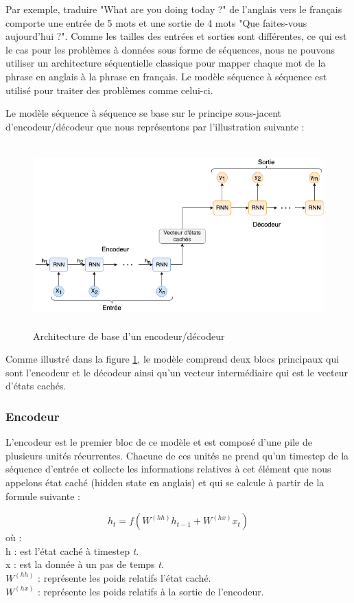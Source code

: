 Par exemple, traduire "What are you doing today ?" de l'anglais vers le français comporte une entrée de 5 mots et une sortie de 4 mots "Que faites-vous aujourd'hui ?". Comme les tailles des entrées et sorties sont différentes, ce qui est le cas pour les problèmes à données sous forme de séquences, nous ne pouvons utiliser un architecture séquentielle classique pour mapper chaque mot de la phrase en anglais à la phrase en français. Le modèle séquence à séquence est utilisé pour traiter des problèmes comme celui-ci.

Le modèle séquence à séquence se base sur le principe sous-jacent d'encodeur/décodeur \cite{encdecdef} que nous représentons par l'illustration suivante :
\begin{figure}[H]
    \centering
    \includegraphics[height=200pt,width=400pt]{images/chap3/EncDec.png}
    \caption{Architecture de base d'un encodeur/décodeur}
    \label{Enc_Dec}
\end{figure}

Comme illustré dans la figure \ref{Enc_Dec}, le modèle comprend deux blocs principaux qui sont l'encodeur et le décodeur ainsi qu'un vecteur intermédiaire qui est le vecteur d'états cachés.


\subsubsection{Encodeur}
L'encodeur est le premier bloc de ce modèle et est composé d'une pile de plusieurs unités récurrentes. Chacune de ces unités ne prend qu'un timestep de la séquence d'entrée et collecte les informations relatives à cet élément que nous appelons état caché (hidden state en anglais) et qui se calcule à partir de la formule suivante :

\begin{equation}
    h_{t} = f(W^{(hh)}h_{t-1} + W^{(hx)}x_{t})
\end{equation}
    où :\\ 
    h : est l'état caché à timestep \textit{t}. \\
    x : est la donnée à un pas de temps \textit{t}. \\
    $W^{(hh)}$ : représente les poids relatifs l'état caché.\\
    $W^{(hx)}$ : représente les poids relatifs à la sortie de l'encodeur.

